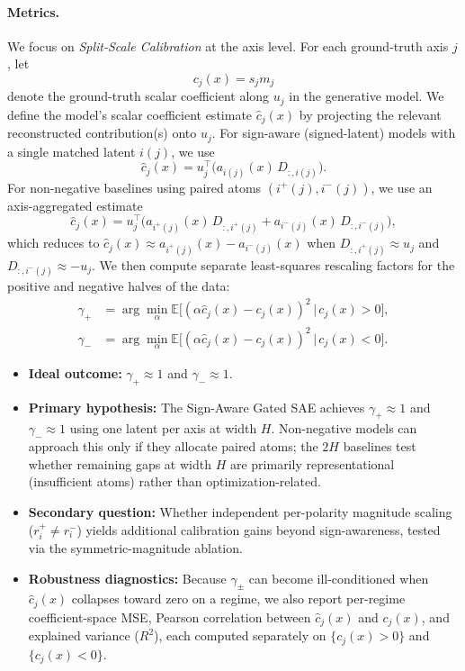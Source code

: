 \documentclass{article}
\newcommand{\E}{\mathbb{E}}
\begin{document}
\paragraph{Metrics.}
We focus on \textit{Split-Scale Calibration} at the axis level. For each ground-truth axis $j$, let
\begin{equation}
    c_j(x) = s_j m_j
\end{equation}
denote the ground-truth scalar coefficient along $u_j$ in the generative model. We define the model's scalar coefficient
estimate $\hat{c}_j(x)$ by projecting the relevant reconstructed contribution(s) onto $u_j$.
For sign-aware (signed-latent) models with a single matched latent $i(j)$, we use
\begin{equation}
    \hat{c}_j(x) = u_j^\top \big( a_{i(j)}(x)\, D_{:,i(j)} \big).
\end{equation}
For non-negative baselines using paired atoms $(i^+(j), i^-(j))$, we use an axis-aggregated estimate
\begin{equation}
    \hat{c}_j(x) = u_j^\top \Big( a_{i^+(j)}(x)\, D_{:,i^+(j)} + a_{i^-(j)}(x)\, D_{:,i^-(j)} \Big),
\end{equation}
which reduces to $\hat{c}_j(x)\approx a_{i^+(j)}(x)-a_{i^-(j)}(x)$ when $D_{:,i^+(j)}\approx u_j$ and
$D_{:,i^-(j)}\approx -u_j$.
We then compute separate least-squares rescaling factors for the positive and negative halves of the data:
\begin{align}
    \gamma_+ &= \arg\min_{\alpha} \E\big[(\alpha \hat{c}_j(x) - c_j(x))^2 \,\big|\, c_j(x) > 0\big], \\
    \gamma_- &= \arg\min_{\alpha} \E\big[(\alpha \hat{c}_j(x) - c_j(x))^2 \,\big|\, c_j(x) < 0\big].
\end{align}
\begin{itemize}
    \item \textbf{Ideal outcome:} $\gamma_+ \approx 1$ and $\gamma_- \approx 1$.
    \item \textbf{Primary hypothesis:} The Sign-Aware Gated SAE achieves $\gamma_+ \approx 1$ and $\gamma_- \approx 1$ using
    one latent per axis at width $H$. Non-negative models can approach this only if they allocate paired atoms; the $2H$
    baselines test whether remaining gaps at width $H$ are primarily representational (insufficient atoms) rather than
    optimization-related.
    \item \textbf{Secondary question:} Whether independent per-polarity magnitude scaling ($r_i^+ \neq r_i^-$) yields
    additional calibration gains beyond sign-awareness, tested via the symmetric-magnitude ablation.
    \item \textbf{Robustness diagnostics:} Because $\gamma_\pm$ can become ill-conditioned when $\hat{c}_j(x)$ collapses
    toward zero on a regime, we also report per-regime coefficient-space MSE, Pearson correlation between $\hat{c}_j(x)$ and
    $c_j(x)$, and explained variance ($R^2$), each computed separately on $\{c_j(x)>0\}$ and $\{c_j(x)<0\}$.
\end{itemize}
\end{document}
